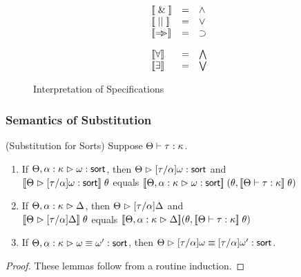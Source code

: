 \begin{figure}
\begin{displaymath}
\begin{array}{lcl}
\interp{\specand} & = & \land \\
\interp{\specor}  & = & \vee  \\
\interp{\specimp} & = & \implies \\[1em]

\interp{\forall} & = & \bigwedge \\
\interp{\exists} & = & \bigvee \\

\end{array}
\end{displaymath}
\caption{Interpretation of Specifications}
\label{spec-interpretation}  
\end{figure}

\subsubsection{Semantics of Substitution}

\begin{lemma}{(Substitution for Sorts)}
Suppose $\judgeWK{\tau}{\kappa}$.
\begin{enumerate}
\item If $\judgeSort[\Theta, \alpha:\kappa]{\omega}$, then $\judgeSort[\Theta]{[\tau/\alpha]\omega}$ and \\
      $\interp{\judgeSort[\Theta]{[\tau/\alpha]\omega}}\;\theta$ equals
      $\interp{\judgeSort[\Theta, \alpha:\kappa]{\omega}}\;(\theta, \interp{\judgeWK{\tau}{\kappa}}\;\theta)$
\item If $\judgeACtx[\Theta, \alpha:\kappa]{\Delta}$, then $\judgeACtx{{[\tau/\alpha]}\Delta}$ and \\
      $\interp{\judgeACtx{{[\tau/\alpha]}\Delta}}\;\theta$ equals 
      $\interp{\judgeACtx[\Theta, \alpha:\kappa]{\Delta}}(\theta, \interp{\judgeWK{\tau}{\kappa}}\;\theta)$ 
\item If $\judgeSortEq[\Theta, \alpha:\kappa]{\omega}{\omega'}$, then
$\judgeSortEq{{[\tau/\alpha]}\omega}{{[\tau/\alpha]}\omega'}$. 
\end{enumerate}
\end{lemma}
\begin{proof}
  These lemmas follow from a routine induction.
\end{proof}


